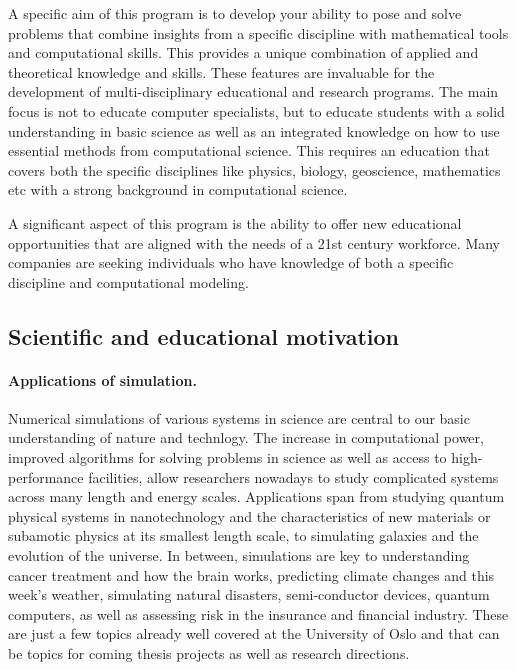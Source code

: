 \documentclass[%
oneside,                 %
final,                   %
10pt]{article}
\begin{document}
A specific aim of this program is to develop your ability to pose and
solve problems that combine  insights from a specific discipline with mathematical tools
and computational skills. This provides a unique combination
of applied and theoretical knowledge and skills. These features are invaluable
for the development of multi-disciplinary educational and research programs.
The main focus is not to educate computer
specialists, but to educate students with a solid understanding in basic science
as well as an integrated knowledge on how  to use
essential methods from computational science. This requires an
education that covers both the specific disciplines like physics, biology,
geoscience, mathematics etc with a strong background in computational science.

A significant aspect of this program is the ability to offer new educational
opportunities that are aligned with the needs of a 21st century
workforce. Many companies are seeking
individuals who have knowledge of both a specific discipline and
computational modeling.

\subsection{Scientific and educational motivation}


\paragraph{Applications of simulation.}
Numerical simulations of various systems in science are central to our
basic understanding of nature and technlogy.
The increase in computational power,
improved algorithms for solving problems in science as well as access
to high-performance facilities, allow researchers nowadays to study
complicated systems across many length and energy scales. Applications
span from studying quantum physical systems in nanotechnology and the
characteristics of new materials or subamotic physics at its smallest
length scale, to simulating galaxies and the evolution of the universe.
In between, simulations are key to understanding
cancer treatment and how the brain works,
predicting climate changes and this week's weather,
simulating natural disasters, semi-conductor devices,
quantum computers, as well as assessing risk in the insurance and
financial industry. These are just a few topics
already well covered at the University of Oslo and that can be
topics for coming thesis projects as well as research directions.
\end{document}
